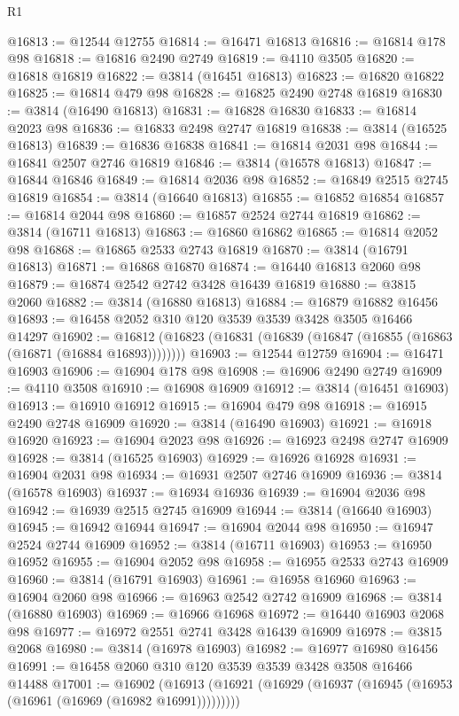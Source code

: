 \begin{lexlean}{R1}
\begin{coremodule}
@16813 := @12544 @12755
@16814 := @16471 @16813
@16816 := @16814 @178 @98
@16818 := @16816 @2490 @2749
@16819 := @4110 @3505
@16820 := @16818 @16819
@16822 := @3814 (@16451 @16813)
@16823 := @16820 @16822
@16825 := @16814 @479 @98
@16828 := @16825 @2490 @2748 @16819
@16830 := @3814 (@16490 @16813)
@16831 := @16828 @16830
@16833 := @16814 @2023 @98
@16836 := @16833 @2498 @2747 @16819
@16838 := @3814 (@16525 @16813)
@16839 := @16836 @16838
@16841 := @16814 @2031 @98
@16844 := @16841 @2507 @2746 @16819
@16846 := @3814 (@16578 @16813)
@16847 := @16844 @16846
@16849 := @16814 @2036 @98
@16852 := @16849 @2515 @2745 @16819
@16854 := @3814 (@16640 @16813)
@16855 := @16852 @16854
@16857 := @16814 @2044 @98
@16860 := @16857 @2524 @2744 @16819
@16862 := @3814 (@16711 @16813)
@16863 := @16860 @16862
@16865 := @16814 @2052 @98
@16868 := @16865 @2533 @2743 @16819
@16870 := @3814 (@16791 @16813)
@16871 := @16868 @16870
@16874 := @16440 @16813 @2060 @98
@16879 := @16874 @2542 @2742 @3428 @16439 @16819
@16880 := @3815 @2060
@16882 := @3814 (@16880 @16813)
@16884 := @16879 @16882 @16456
@16893 := @16458 @2052 @310 @120 @3539 @3539 @3428 @3505 @16466 @14297
@16902 := @16812 (@16823 (@16831 (@16839 (@16847 (@16855 (@16863 (@16871 (@16884 @16893))))))))
@16903 := @12544 @12759
@16904 := @16471 @16903
@16906 := @16904 @178 @98
@16908 := @16906 @2490 @2749
@16909 := @4110 @3508
@16910 := @16908 @16909
@16912 := @3814 (@16451 @16903)
@16913 := @16910 @16912
@16915 := @16904 @479 @98
@16918 := @16915 @2490 @2748 @16909
@16920 := @3814 (@16490 @16903)
@16921 := @16918 @16920
@16923 := @16904 @2023 @98
@16926 := @16923 @2498 @2747 @16909
@16928 := @3814 (@16525 @16903)
@16929 := @16926 @16928
@16931 := @16904 @2031 @98
@16934 := @16931 @2507 @2746 @16909
@16936 := @3814 (@16578 @16903)
@16937 := @16934 @16936
@16939 := @16904 @2036 @98
@16942 := @16939 @2515 @2745 @16909
@16944 := @3814 (@16640 @16903)
@16945 := @16942 @16944
@16947 := @16904 @2044 @98
@16950 := @16947 @2524 @2744 @16909
@16952 := @3814 (@16711 @16903)
@16953 := @16950 @16952
@16955 := @16904 @2052 @98
@16958 := @16955 @2533 @2743 @16909
@16960 := @3814 (@16791 @16903)
@16961 := @16958 @16960
@16963 := @16904 @2060 @98
@16966 := @16963 @2542 @2742 @16909
@16968 := @3814 (@16880 @16903)
@16969 := @16966 @16968
@16972 := @16440 @16903 @2068 @98
@16977 := @16972 @2551 @2741 @3428 @16439 @16909
@16978 := @3815 @2068
@16980 := @3814 (@16978 @16903)
@16982 := @16977 @16980 @16456
@16991 := @16458 @2060 @310 @120 @3539 @3539 @3428 @3508 @16466 @14488
@17001 := @16902
    (@16913 (@16921 (@16929 (@16937 (@16945 (@16953 (@16961 (@16969 (@16982 @16991)))))))))

\end{coremodule}
\end{lexlean}
